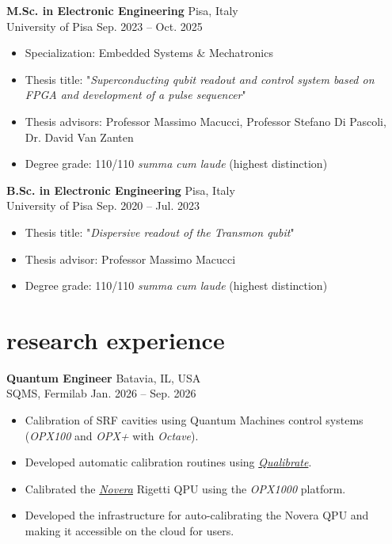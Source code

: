 \documentclass[11pt]{article}
\newcommand{\entry}[4]{{{\textbf{#1}}} \hfill #3 \\ #2 \hfill #4}
\begin{document}
	\entry{M.Sc. in Electronic Engineering}{University of Pisa}{Pisa, Italy}{Sep. 2023 -- Oct. 2025}
	\begin{itemize}[noitemsep,leftmargin=10.0mm,rightmargin=0mm,topsep=6pt]
		\item Specialization: Embedded Systems \& Mechatronics
		\item Thesis title: "\textit{Superconducting qubit readout and control system based on FPGA and development of a pulse sequencer}"
		\item Thesis advisors: Professor Massimo Macucci, Professor Stefano Di Pascoli, Dr. David Van Zanten
		\item Degree grade: 110/110 \textit{summa cum laude} (highest distinction)
	\end{itemize}
	
	
	\entry{B.Sc. in Electronic Engineering}{University of Pisa}{Pisa, Italy}{Sep. 2020 -- Jul. 2023}
	\begin{itemize}[noitemsep,leftmargin=10.0mm,rightmargin=0mm,topsep=6pt]
		\item Thesis title: "\textit{Dispersive readout of the Transmon qubit}"
		\item Thesis advisor: Professor Massimo Macucci
		\item Degree grade: 110/110 \textit{summa cum laude} (highest distinction)
	\end{itemize}
	
	\section{research experience}

	\entry{Quantum Engineer}{SQMS, Fermilab}{Batavia, IL, USA}{Jan. 2026 -- Sep. 2026}
	\begin{itemize}[noitemsep,leftmargin=10.0mm,rightmargin=0mm,topsep=6pt]
		\item Calibration of SRF cavities using Quantum Machines control systems (\textit{OPX100} and \textit{OPX+} with \textit{Octave}).
		\item Developed automatic calibration routines using \textit{\href{https://qualibrate.qualang.io/}{Qualibrate}}.
		\item Calibrated the \textit{\href{https://www.rigetti.com/novera}{Novera}} Rigetti QPU using the \textit{OPX1000} platform.
		\item Developed the infrastructure for auto-calibrating the Novera QPU and making it accessible on the cloud for users.
	\end{itemize}
\end{document}
